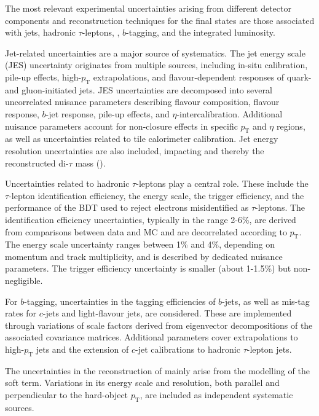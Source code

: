 The most relevant experimental uncertainties arising from different detector components and reconstruction techniques for the \ttHtt final states are those associated with jets, hadronic $\tau$-leptons, \etmiss, $b$-tagging, and the integrated luminosity.  

Jet-related uncertainties are a major source of systematics. The jet energy scale (JES) uncertainty originates from multiple sources, including in-situ calibration, pile-up effects, high-$p_{\text{T}}$ extrapolations, and flavour-dependent responses of quark- and gluon-initiated jets. JES uncertainties are decomposed into several uncorrelated nuisance parameters describing flavour composition, flavour response, $b$-jet response, pile-up effects, and $\eta$-intercalibration. Additional nuisance parameters account for non-closure effects in specific $p_{\text{T}}$ and $\eta$ regions, as well as uncertainties related to tile calorimeter calibration. Jet energy resolution uncertainties are also included, impacting \etmiss and thereby the reconstructed di-$\tau$ mass (\mmc).  

Uncertainties related to hadronic $\tau$-leptons play a central role. These include the $\tau$-lepton identification efficiency, the energy scale, the trigger efficiency, and the performance of the BDT used to reject electrons misidentified as $\tau$-leptons. The identification efficiency uncertainties, typically in the range 2-6\%, are derived from comparisons between data and MC and are decorrelated according to $p_{\text{T}}$. The energy scale uncertainty ranges between 1\% and 4\%, depending on momentum and track multiplicity, and is described by dedicated nuisance parameters. The trigger efficiency uncertainty is smaller (about 1-1.5\%) but non-negligible.  

For $b$-tagging, uncertainties in the tagging efficiencies of $b$-jets, as well as mis-tag rates for $c$-jets and light-flavour jets, are considered. These are implemented through variations of scale factors derived from eigenvector decompositions of the associated covariance matrices. Additional parameters cover extrapolations to high-$p_{\text{T}}$ jets and the extension of $c$-jet calibrations to hadronic $\tau$-lepton jets.  

The uncertainties in the reconstruction of \etmiss mainly arise from the modelling of the soft term. Variations in its energy scale and resolution, both parallel and perpendicular to the hard-object $p_{\text{T}}$, are included as independent systematic sources.  

